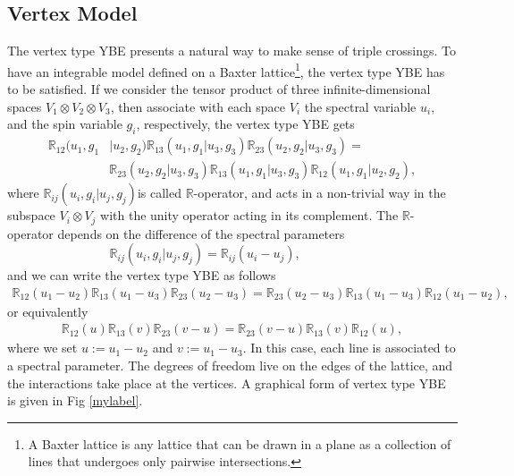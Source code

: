 \documentclass[a4paper,11pt]{article}%
\numberwithin{equation}{section}
\begin{document}
\subsection{Vertex Model}
\linespread{0.5}
The vertex type YBE presents a natural way to make sense of triple crossings. To have an integrable model defined on a Baxter lattice\footnote{A Baxter lattice is any
lattice that can be drawn in a plane as a collection of lines  that undergoes only pairwise intersections.}, the vertex type YBE has to be  satisfied.  If we consider the tensor product of three infinite-dimensional
spaces $V_1\otimes V_2\otimes V_3$, then associate with each space $V_i$ the spectral variable $u_i$, and the spin variable $g_i$, respectively, the vertex type YBE gets 
\begin{align} \nonumber\label{Vertex}
    \mathbb{R}_{12}(u_1,g_1&|u_2,g_2) \mathbb{R} _{13}(u_1,g_1|u_3,g_3) \mathbb{R} _{23}(u_2,g_2|u_3,g_3)=\\\qquad & \mathbb{R} _{23}(u_2,g_2|u_3,g_3)  \mathbb{R} _{13}(u_1,g_1|u_3,g_3)  \mathbb{R}_{12}(u_1,g_1|u_2,g_2),
\end{align}
where $\mathbb{R}_{ij}(u_i,g_i|u_j,g_j)$is called $\mathbb{R}$-operator, and acts in a non-trivial way in the subspace $V_i\otimes V_j$ with the unity
operator acting in its complement. The $\mathbb{R}$-operator depends on the difference of the spectral parameters
\begin{equation}
\mathbb{R}_{ij}(u_i,g_i|u_j,g_j)=\mathbb{R}_{ij}(u_i-u_j),\qquad\qquad\,\,
\end{equation}
and we can write the vertex type YBE as follows
 \begin{align}\label{YBE}
     \mathbb{R}_{12}(u_1-u_2) \mathbb{R}_{13}(u_1-u_3) \mathbb{R}_{23}(u_2-u_3)= \mathbb{R}_{23}(u_2-u_3)\mathbb{R}_{13}(u_1-u_3)\mathbb{R}_{12}(u_1-u_2),  
 \end{align}
or equivalently
\begin{align}
     \mathbb{R}_{12}(u) \mathbb{R}_{13}(v) \mathbb{R}_{23}(v-u)= \mathbb{R}_{23}(v-u)\mathbb{R}_{13}(v)\mathbb{R}_{12}(u), 
 \end{align}
 where we set $u:=u_1-u_2$ and $v:=u_1-u_3$. In this case,
each line is associated to a spectral
parameter. The degrees of freedom live on the edges of the lattice, and the interactions take place at the vertices.
 A graphical form of vertex type YBE is given in Fig \ref{mylabel}. 
\end{document}
